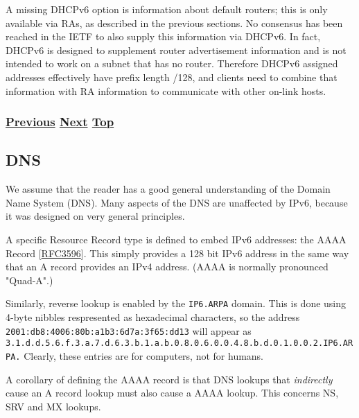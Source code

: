 \documentclass[
]{article}
\begin{document}
A missing DHCPv6 option is information about default routers; this is
only available via RAs, as described in the previous sections. No
consensus has been reached in the IETF to also supply this information
via DHCPv6. In fact, DHCPv6 is designed to supplement router
advertisement information and is not intended to work on a subnet that
has no router. Therefore DHCPv6 assigned addresses effectively have
prefix length /128, and clients need to combine that information with RA
information to communicate with other on-link hosts.

\subsubsection{\texorpdfstring{\hyperref[auto-configuration]{Previous}
\hyperref[dns]{Next}
\hyperref[ipv6-basic-technology]{Top}}{Previous Next Top}}\label{previous-next-top-12}

\pagebreak

\subsection{DNS}\label{dns}

We assume that the reader has a good general understanding of the Domain
Name System (DNS). Many aspects of the DNS are unaffected by IPv6,
because it was designed on very general principles.

A specific Resource Record type is defined to embed IPv6 addresses: the
AAAA Record
{[}\href{https://www.rfc-editor.org/info/rfc3596}{RFC3596}{]}. This
simply provides a 128 bit IPv6 address in the same way that an A record
provides an IPv4 address. (AAAA is normally pronounced "Quad-A".)

Similarly, reverse lookup is enabled by the \texttt{IP6.ARPA} domain.
This is done using 4-byte nibbles respresented as hexadecimal
characters, so the address
\texttt{2001:db8:4006:80b:a1b3:6d7a:3f65:dd13} will appear as
\texttt{3.1.d.d.5.6.f.3.a.7.d.6.3.b.1.a.b.0.8.0.6.0.0.4.8.b.d.0.1.0.0.2.IP6.ARPA.}
Clearly, these entries are for computers, not for humans.

A corollary of defining the AAAA record is that DNS lookups that
\emph{indirectly} cause an A record lookup must also cause a AAAA
lookup. This concerns NS, SRV and MX lookups.
\end{document}

